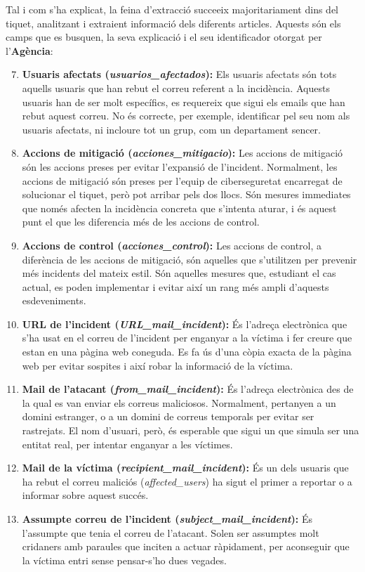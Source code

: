 Tal i com s'ha explicat, la feina d'extracció succeeix majoritariament dins del tiquet, analitzant i extraient informació dels diferents articles. Aquests són els camps que es busquen, la seva explicació i el seu identificador otorgat per l'\textbf{Agència}: 
\begin{enumerate}
  \setcounter{enumi}{6}
  \item \textbf{Usuaris afectats (\textit{usuarios\_afectados}):} Els usuaris afectats són tots aquells usuaris que han rebut el correu referent a la incidència. Aquests usuaris han de ser molt específics, es requereix que sigui els emails que han rebut aquest correu. No és correcte, per exemple, identificar pel seu nom als usuaris afectats, ni incloure tot un grup, com un departament sencer.
  \item \textbf{Accions de mitigació (\textit{acciones\_mitigacio}):} Les accions de mitigació són les accions preses per evitar l'expansió de l'incident. Normalment, les accions de mitigació són preses per l'equip de ciberseguretat encarregat de solucionar el tiquet, però pot arribar pels dos llocs. Són mesures immediates que només afecten la incidència concreta que s'intenta aturar, i és aquest punt el que les diferencia més de les accions de control.
  \item \textbf{Accions de control (\textit{acciones\_control}):} Les accions de control, a diferència de les accions de mitigació, són aquelles que s'utilitzen per prevenir més incidents del mateix estil. Són aquelles mesures que, estudiant el cas actual, es poden implementar i evitar així un rang més ampli d'aquests esdeveniments.
  \item \textbf{URL de l'incident (\textit{URL\_mail\_incident}):} És l'adreça electrònica que s'ha usat en el correu de l'incident per enganyar a la víctima i fer creure que estan en una pàgina web coneguda. Es fa ús d'una còpia exacta de la pàgina web per evitar sospites i així robar la informació de la víctima.
  \item \textbf{Mail de l'atacant (\textit{from\_mail\_incident}):} És l'adreça electrònica des de la qual es van enviar els correus maliciosos. Normalment, pertanyen a un domini estranger, o a un domini de correus temporals per evitar ser rastrejats. El nom d'usuari, però, és esperable que sigui un que simula ser una entitat real, per intentar enganyar a les víctimes.
  \item \textbf{Mail de la víctima (\textit{recipient\_mail\_incident}):} És un dels usuaris que ha rebut el correu maliciós (\textit{affected\_users}) ha sigut el primer a reportar o a informar sobre aquest succés.
  \item \textbf{Assumpte correu de l'incident (\textit{subject\_mail\_incident}):} És l'assumpte que tenia el correu de l'atacant. Solen ser assumptes molt cridaners amb paraules que inciten a actuar ràpidament, per aconseguir que la víctima entri sense pensar-s'ho dues vegades.
\end{enumerate}

